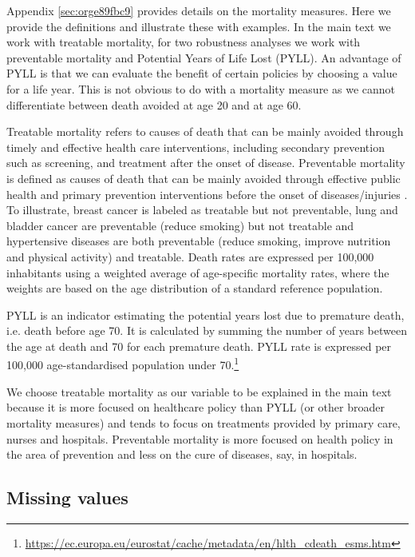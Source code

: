 \documentclass[a4paper,12pt]{article}
\begin{document}
Appendix \ref{sec:orge89fbc9} provides details on the mortality measures. Here we provide the definitions and illustrate these with examples. In the main text we work with treatable mortality, for two robustness analyses we work with preventable mortality and Potential Years of Life Lost (PYLL). An advantage of PYLL is that we can evaluate the benefit of certain policies by choosing a value for a life year. This is not obvious to do with a mortality measure as we cannot differentiate between death avoided at age 20 and at age 60.

Treatable mortality refers to causes of death that can be mainly avoided through timely and effective health care interventions, including secondary prevention such as screening, and treatment after the onset of disease. Preventable mortality is defined as causes of death that can be mainly avoided through effective public health and primary prevention interventions before the onset of diseases/injuries \citep{countryprofileUK}. To illustrate, breast cancer is labeled as treatable but not preventable, lung and bladder cancer are preventable (reduce smoking) but not treatable and hypertensive diseases are both preventable (reduce smoking, improve nutrition and physical activity) and treatable. Death rates are expressed per 100,000 inhabitants using a weighted average of age-specific mortality rates, where the weights are based on the age distribution of a standard reference population.

PYLL is an indicator estimating the potential years lost due to premature death, i.e. death before age 70. It is calculated by summing the number of years between the age at death and 70 for each premature death. PYLL rate is expressed per 100,000 age-standardised population under 70.\footnote{\url{https://ec.europa.eu/eurostat/cache/metadata/en/hlth\_cdeath\_esms.htm}}

We choose treatable mortality as our variable to be explained in the main text because it is more focused on healthcare policy than PYLL (or other broader mortality measures) and tends to focus on treatments provided by primary care, nurses and hospitals. Preventable mortality is more focused on health policy in the area of prevention and less on the cure of diseases, say, in hospitals.



\subsection{Missing values}
\label{sec:org0330d89}
\end{document}

